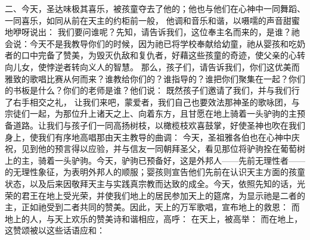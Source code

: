 二、今天，圣达味极其喜乐，被孩童夺去了他的；他也与他们在心神中一同舞蹈、一同喜乐，如同从前在天主的约柜前一般， 他调和音乐和谐，以嗫嚅的声音甜蜜地咿呀说出： 我们要问谁呢？先知，请告诉我们，这位奉主名而来的，是谁？祂会说：今天不是我教导你们的时候，因为祂已将学校奉献给幼童，祂从婴孩和吃奶者的口中完备了赞美，为毁灭仇敌和复仇者，好藉这些孩童的奇迹，使父亲的心转向儿女，使悖逆者转向义人的智慧。 那么，孩子们，请告诉我们，你们这优美而雅致的歌唱比赛从何而来？谁教给你们的？谁指导的？谁把你们聚集在一起？你们的书板是什么？你们的老师是谁？他们说： 既然孩子们邀请了我们，并与我们行了右手相交之礼， 让我们来吧，蒙爱者，我们自己也要效法那神圣的歌咏团，与宗徒们一起，为那位升上诸天之上、向着东方，且甘愿在地上骑着一头驴驹的主预备道路。让我们与孩子们一同高扬树枝，以橄榄枝欢喜鼓掌，好使圣神也吹在我们身上，使我们有序地高唱那由天主教导的曲调： 今天，圣祖雅各伯也在心神中庆祝，见到他的预言得以应验，并与信友一同朝拜圣父，看见那位将驴驹拴在葡萄树上的主，骑着一头驴驹。今天，驴驹已预备好，这是外邦人——先前无理性者——的无理性象征，为表明外邦人的顺服；婴孩则宣告他们先前在认识天主方面的孩童状态，以及后来因敬拜天主与实践真宗教而达致的成全。今天，依照先知的话，光荣的君王在地上受光荣，并使我们地上的居民参加天上的筵席，为显示祂是二者的主，正如祂受到二者共同的赞美。因此，天上的万军歌唱，宣布地上的救恩： 而地上的人，与天上欢乐的赞美诗和谐相应，高呼： 在天上，被高举： 而在地上，这赞颂被以这些话语应和：\par


